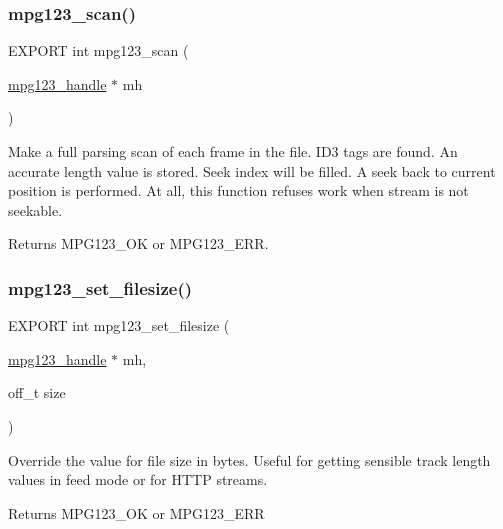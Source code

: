 \subsubsection{\texorpdfstring{mpg123\+\_\+scan()}{mpg123\_scan()}}
{\footnotesize\ttfamily E\+X\+P\+O\+RT int mpg123\+\_\+scan (\begin{DoxyParamCaption}\item[{\hyperlink{group__mpg123__init_ga6728e2839a395f3a07d4514da659faca}{mpg123\+\_\+handle} $\ast$}]{mh }\end{DoxyParamCaption})}

Make a full parsing scan of each frame in the file. I\+D3 tags are found. An accurate length value is stored. Seek index will be filled. A seek back to current position is performed. At all, this function refuses work when stream is not seekable. \begin{DoxyReturn}{Returns}
M\+P\+G123\+\_\+\+OK or M\+P\+G123\+\_\+\+E\+RR. 
\end{DoxyReturn}
\mbox{\label{group__mpg123__status_gad09ab0cda80f6e5df22d67828ffbaa20}} 
\subsubsection{\texorpdfstring{mpg123\+\_\+set\+\_\+filesize()}{mpg123\_set\_filesize()}}
{\footnotesize\ttfamily E\+X\+P\+O\+RT int mpg123\+\_\+set\+\_\+filesize (\begin{DoxyParamCaption}\item[{\hyperlink{group__mpg123__init_ga6728e2839a395f3a07d4514da659faca}{mpg123\+\_\+handle} $\ast$}]{mh,  }\item[{off\+\_\+t}]{size }\end{DoxyParamCaption})}

Override the value for file size in bytes. Useful for getting sensible track length values in feed mode or for H\+T\+TP streams. \begin{DoxyReturn}{Returns}
M\+P\+G123\+\_\+\+OK or M\+P\+G123\+\_\+\+E\+RR 
\end{DoxyReturn}
\mbox{\label{group__mpg123__status_gab8c1a8ff5a39ba8537dfdd9e20283744}} 
